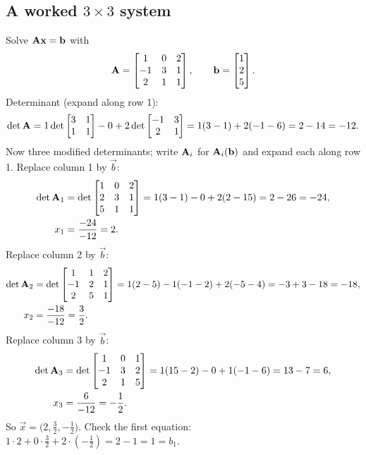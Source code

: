 \subsection{A worked \texorpdfstring{$3\times3$}{3x3} system}

Solve $\mathbf{A}\mathbf{x}=\mathbf{b}$ with
\[
\mathbf{A}=\begin{bmatrix} 1 & 0 & 2 \\ -1 & 3 & 1 \\ 2 & 1 & 1 \end{bmatrix},\qquad
\mathbf{b}=\begin{bmatrix} 1 \\ 2 \\ 5\end{bmatrix}.
\]
Determinant (expand along row 1):
\[
\det\mathbf{A}=1\det\begin{bmatrix}3&1\\1&1\end{bmatrix}-0+2\det\begin{bmatrix}-1&3\\2&1\end{bmatrix}
=1(3-1)+2(-1-6)=2-14=-12.
\]
Now three modified determinants; write $\mathbf{A}_i$ for $\mathbf{A}_i(\mathbf{b})$ and expand each along row 1.
Replace column 1 by $\vec b$:
\[
\begin{aligned}
\det\mathbf{A}_1&=\det\begin{bmatrix} 1 & 0 & 2 \\ 2 & 3 & 1 \\ 5 & 1 & 1 \end{bmatrix}
=1(3-1)-0+2(2-15)=2-26=-24,\\
x_1&=\frac{-24}{-12}=2.
\end{aligned}
\]
Replace column 2 by $\vec b$:
\[
\begin{aligned}
\det\mathbf{A}_2&=\det\begin{bmatrix} 1 & 1 & 2 \\ -1 & 2 & 1 \\ 2 & 5 & 1 \end{bmatrix}
=1(2-5)-1(-1-2)+2(-5-4)=-3+3-18=-18,\\
x_2&=\frac{-18}{-12}=\frac32.
\end{aligned}
\]
Replace column 3 by $\vec b$:
\[
\begin{aligned}
\det\mathbf{A}_3&=\det\begin{bmatrix} 1 & 0 & 1 \\ -1 & 3 & 2 \\ 2 & 1 & 5 \end{bmatrix}
=1(15-2)-0+1(-1-6)=13-7=6,\\
x_3&=\frac{6}{-12}=-\frac12.
\end{aligned}
\]
So $\vec x=\big(2,\tfrac32,-\tfrac12\big)$. Check the first equation:
$1\cdot2+0\cdot\tfrac32+2\cdot(-\tfrac12)=2-1=1=b_1$.

